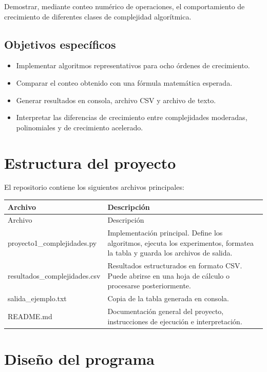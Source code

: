 \documentclass[12pt,letterpaper]{article}
\begin{document}
Demostrar, mediante conteo numérico de operaciones, el comportamiento de crecimiento de diferentes clases de complejidad algorítmica.

\subsection{Objetivos específicos}

\begin{itemize}
    \item Implementar algoritmos representativos para ocho órdenes de crecimiento.
    \item Comparar el conteo obtenido con una fórmula matemática esperada.
    \item Generar resultados en consola, archivo CSV y archivo de texto.
    \item Interpretar las diferencias de crecimiento entre complejidades moderadas, polinomiales y de crecimiento acelerado.
\end{itemize}

\section{Estructura del proyecto}

El repositorio contiene los siguientes archivos principales:

\begin{longtable}{>{\ttfamily}p{} p{}}
\toprule
\normalfont Archivo & Descripción \\
\midrule
\endfirsthead
\toprule
\normalfont Archivo & Descripción \\
\midrule
\endhead
proyecto1\_complejidades.py & Implementación principal. Define los algoritmos, ejecuta los experimentos, formatea la tabla y guarda los archivos de salida. \\
resultados\_complejidades.csv & Resultados estructurados en formato CSV. Puede abrirse en una hoja de cálculo o procesarse posteriormente. \\
salida\_ejemplo.txt & Copia de la tabla generada en consola. \\
README.md & Documentación general del proyecto, instrucciones de ejecución e interpretación. \\
\bottomrule
\end{longtable}

\section{Diseño del programa}
\end{document}
